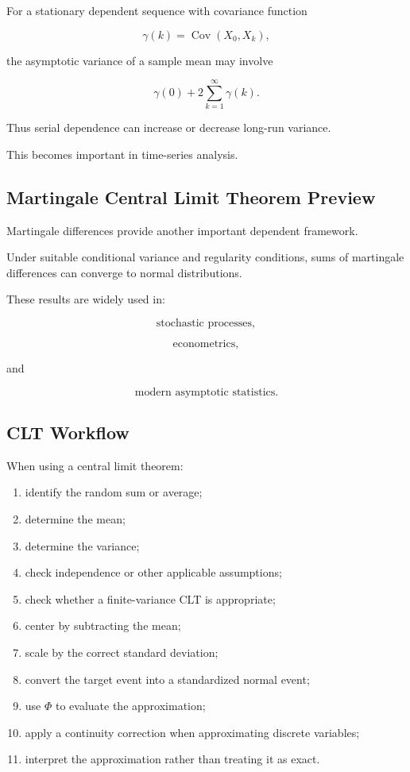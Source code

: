 For a stationary dependent sequence with covariance function

\[
\gamma(k)
=
\operatorname{Cov}(X_0,X_k),
\]

the asymptotic variance of a sample mean may involve

\[
\boxed{
\gamma(0)
+
2
\sum_{k=1}^{\infty}
\gamma(k).
}
\]

Thus serial dependence can increase or decrease long-run variance.

This becomes important in time-series analysis.

\subsection{Martingale Central Limit Theorem Preview}
\label{subsec:martingale-clt-preview}

Martingale differences provide another important dependent framework.

Under suitable conditional variance and regularity conditions, sums of
martingale differences can converge to normal distributions.

These results are widely used in:

\[
\text{stochastic processes},
\]

\[
\text{econometrics},
\]

and

\[
\text{modern asymptotic statistics}.
\]

\subsection{CLT Workflow}
\label{subsec:clt-workflow}

When using a central limit theorem:

\begin{enumerate}
    \item identify the random sum or average;
    \item determine the mean;
    \item determine the variance;
    \item check independence or other applicable assumptions;
    \item check whether a finite-variance CLT is appropriate;
    \item center by subtracting the mean;
    \item scale by the correct standard deviation;
    \item convert the target event into a standardized normal event;
    \item use \(\Phi\) to evaluate the approximation;
    \item apply a continuity correction when approximating discrete
          variables;
    \item interpret the approximation rather than treating it as exact.
\end{enumerate}

